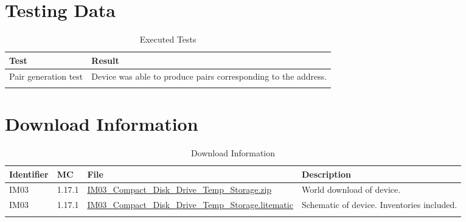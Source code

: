 \documentclass[10pt]{datasheet}
\begin{document}
\section{Testing Data}
\begin{table}[h]
\caption{Executed Tests}
\begin{tabularx}{\textwidth}{l | X}
    \thickhline
    \textbf{Test} & \textbf{Result} \\
    \hline
    Pair generation test & Device was able to produce pairs corresponding to the address. \\
    \thickhline
\end{tabularx}
\end{table}

\section{Download Information}
\begin{table}[h]
    \caption{Download Information}
    \begin{tabularx}{\textwidth}{l | l | l | X}
        \thickhline
        \textbf{Identifier} & \textbf{MC} & \textbf{File} & \textbf{Description} \\
        \hline
        IM03 & 1.17.1 & \href{https://github.com/Soontech-Annals/Archive/blob/63c9ea8c34519ca4eb58649773e0c37e7e462fdd/Archive/item-memory/IM03\%20Compact\%20Disk\%20Drive\%20Temp\%20Storage/IM03\_Compact\_Disk\_Drive\_Temp\_Storage.zip?raw=1}{IM03\_Compact\_Disk\_Drive\_Temp\_Storage.zip} & World download of device. \\
        \hline
        IM03 & 1.17.1 & \href{https://github.com/Soontech-Annals/Archive/blob/63c9ea8c34519ca4eb58649773e0c37e7e462fdd/Archive/item-memory/IM03\%20Compact\%20Disk\%20Drive\%20Temp\%20Storage/IM03\_Compact\_Disk\_Drive\_Temp\_Storage.litematic?raw=1}{IM03\_Compact\_Disk\_Drive\_Temp\_Storage.litematic} & Schematic of device. Inventories included. \\
        \hline
        \thickhline
    \end{tabularx}
\end{table}
\end{document}
